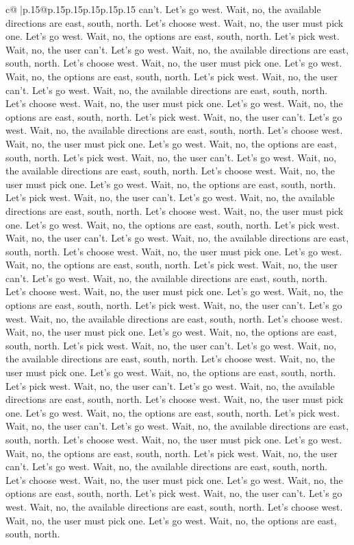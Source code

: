 \documentclass{article}
\begin{document}
{\begin{supertabular}{c@{$\;$}|p{.15\linewidth}@{}p{.15\linewidth}p{.15\linewidth}p{.15\linewidth}p{.15\linewidth}p{.15\linewidth}}
{{{can't. Let's go west. Wait, no, the available directions are east, south, north. Let's choose west. Wait, no, the user must pick one. Let's go west. Wait, no, the options are east, south, north. Let's pick west. Wait, no, the user can't. Let's go west. Wait, no, the available directions are east, south, north. Let's choose west. Wait, no, the user must pick one. Let's go west. Wait, no, the options are east, south, north. Let's pick west. Wait, no, the user can't. Let's go west. Wait, no, the available directions are east, south, north. Let's choose west. Wait, no, the user must pick one. Let's go west. Wait, no, the options are east, south, north. Let's pick west. Wait, no, the user can't. Let's go west. Wait, no, the available directions are east, south, north. Let's choose west. Wait, no, the user must pick one. Let's go west. Wait, no, the options are east, south, north. Let's pick west. Wait, no, the user can't. Let's go west. Wait, no, the available directions are east, south, north. Let's choose west. Wait, no, the user must pick one. Let's go west. Wait, no, the options are east, south, north. Let's pick west. Wait, no, the user can't. Let's go west. Wait, no, the available directions are east, south, north. Let's choose west. Wait, no, the user must pick one. Let's go west. Wait, no, the options are east, south, north. Let's pick west. Wait, no, the user can't. Let's go west. Wait, no, the available directions are east, south, north. Let's choose west. Wait, no, the user must pick one. Let's go west. Wait, no, the options are east, south, north. Let's pick west. Wait, no, the user can't. Let's go west. Wait, no, the available directions are east, south, north. Let's choose west. Wait, no, the user must pick one. Let's go west. Wait, no, the options are east, south, north. Let's pick west. Wait, no, the user can't. Let's go west. Wait, no, the available directions are east, south, north. Let's choose west. Wait, no, the user must pick one. Let's go west. Wait, no, the options are east, south, north. Let's pick west. Wait, no, the user can't. Let's go west. Wait, no, the available directions are east, south, north. Let's choose west. Wait, no, the user must pick one. Let's go west. Wait, no, the options are east, south, north. Let's pick west. Wait, no, the user can't. Let's go west. Wait, no, the available directions are east, south, north. Let's choose west. Wait, no, the user must pick one. Let's go west. Wait, no, the options are east, south, north. Let's pick west. Wait, no, the user can't. Let's go west. Wait, no, the available directions are east, south, north. Let's choose west. Wait, no, the user must pick one. Let's go west. Wait, no, the options are east, south, north. Let's pick west. Wait, no, the user can't. Let's go west. Wait, no, the available directions are east, south, north. Let's choose west. Wait, no, the user must pick one. Let's go west. Wait, no, the options are east, south, north. Let's pick west. Wait, no, the user can't. Let's go west. Wait, no, the available directions are east, south, north. Let's choose west. Wait, no, the user must pick one. Let's go west. Wait, no, the options are east, south, north. }}}
\end{supertabular}}
\end{document}
